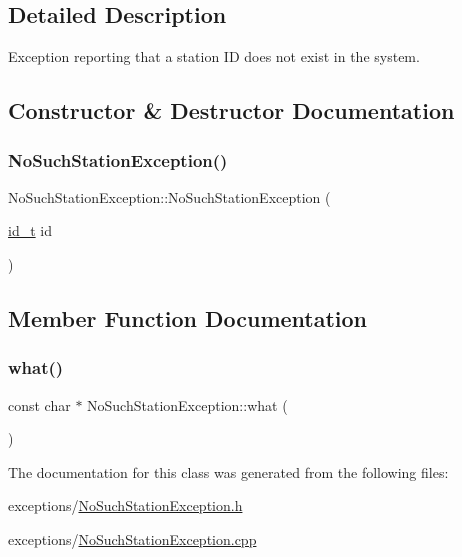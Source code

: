 \subsection{Detailed Description}
Exception reporting that a station ID does not exist in the system. 

\subsection{Constructor \& Destructor Documentation}
\mbox{\label{classNoSuchStationException_a3e907e61f0836f6954f40bd63538bcb6}} 
\subsubsection{\texorpdfstring{No\+Such\+Station\+Exception()}{NoSuchStationException()}}
{\footnotesize\ttfamily No\+Such\+Station\+Exception\+::\+No\+Such\+Station\+Exception (\begin{DoxyParamCaption}\item[{\mbox{\hyperlink{project__utils_8h_a8f3a969054ad2200720b96e7e23dd4e1}{id\+\_\+t}}}]{id }\end{DoxyParamCaption})}



\subsection{Member Function Documentation}
\mbox{\label{classNoSuchStationException_ab67522921093ac926cc70e2fb0a0730c}} 
\subsubsection{\texorpdfstring{what()}{what()}}
{\footnotesize\ttfamily const char $\ast$ No\+Such\+Station\+Exception\+::what (\begin{DoxyParamCaption}{ }\end{DoxyParamCaption})}



The documentation for this class was generated from the following files\+:\begin{DoxyCompactItemize}
\item 
exceptions/\mbox{\hyperlink{NoSuchStationException_8h}{No\+Such\+Station\+Exception.\+h}}\item 
exceptions/\mbox{\hyperlink{NoSuchStationException_8cpp}{No\+Such\+Station\+Exception.\+cpp}}\end{DoxyCompactItemize}
